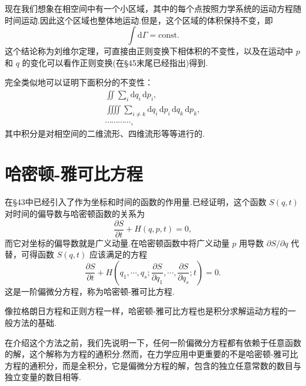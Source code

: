 现在我们想象在相空间中有一个小区域，其中的每个点按照力学系统的运动方程随时间运动.因此这个区域也整体地运动.但是，这个区域的体积保持不变，即
\begin{equation}
  \int\mathrm{d}\Gamma=\mathrm{const.}
\end{equation}
这个结论称为刘维尔定理，可直接由正则变换下相体积的不变性，以及在运动中
$p$ 和 $q$
的变化可以看作正则变换(在§45末尾已经指出)得到.

完全类似地可以证明下面积分的不变性：
\begin{equation*}
\begin{array}{r}
  \iint\sum_i\mathrm{d}q_i\,\mathrm{d}p_i,\\
  \iiiint\sum_{i\neq k}\mathrm{d}q_i\,\mathrm{d}p_i\,\mathrm{d}q_k\,\mathrm{d}p_k,\\
  \cdots\cdots\cdots\cdots,
\end{array}
\end{equation*}
其中积分是对相空间的二维流形、四维流形等等进行的.

\section{哈密顿-雅可比方程}

在§43中已经引入了作为坐标和时间的函数的作用量.已经证明，这个函数
$S(q,t)$ 对时间的偏导数与哈密顿函数的关系为
\begin{equation*}
  \frac{\partial S}{\partial t}+H(q,p,t)=0,
\end{equation*}
而它对坐标的偏导数就是广义动量.在哈密顿函数中将广义动量
$p$ 用导数 $\partial S/\partial q$
代替，可得函数 $S(q,t)$ 应该满足的方程
\begin{equation}
  \frac{\partial S}{\partial t}
  +H\left(q_1,\cdots,q_s;\frac{\partial S}{\partial q_1},\cdots,
  \frac{\partial S}{\partial q_s};t\right)=0.
\end{equation}
这是一阶偏微分方程，称为哈密顿-雅可比方程.

像拉格朗日方程和正则方程一样，哈密顿-雅可比方程也是积分求解运动方程的一般方法的基础.

在介绍这个方法之前，我们先说明一下，任何一阶偏微分方程都有依赖于任意函数的解，这个解称为方程的通积分.然而，在力学应用中更重要的不是哈密顿-雅可比方程的通积分，而是全积分，它是偏微分方程的解，包含的独立任意常数的数目与独立变量的数目相等.

